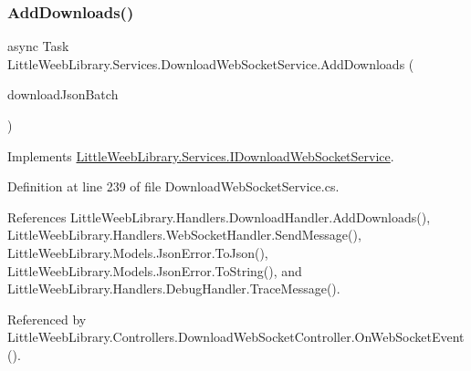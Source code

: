 \mbox{\label{class_little_weeb_library_1_1_services_1_1_download_web_socket_service_ad6afd5ee42650d16c67790c6d2ac80c1}} 
\subsubsection{\texorpdfstring{Add\+Downloads()}{AddDownloads()}}
{\footnotesize\ttfamily async Task Little\+Weeb\+Library.\+Services.\+Download\+Web\+Socket\+Service.\+Add\+Downloads (\begin{DoxyParamCaption}\item[{J\+Object}]{download\+Json\+Batch }\end{DoxyParamCaption})}



Implements \mbox{\hyperlink{interface_little_weeb_library_1_1_services_1_1_i_download_web_socket_service_ad25da3bc121e428c5bcead6bd2feb8aa}{Little\+Weeb\+Library.\+Services.\+I\+Download\+Web\+Socket\+Service}}.



Definition at line 239 of file Download\+Web\+Socket\+Service.\+cs.



References Little\+Weeb\+Library.\+Handlers.\+Download\+Handler.\+Add\+Downloads(), Little\+Weeb\+Library.\+Handlers.\+Web\+Socket\+Handler.\+Send\+Message(), Little\+Weeb\+Library.\+Models.\+Json\+Error.\+To\+Json(), Little\+Weeb\+Library.\+Models.\+Json\+Error.\+To\+String(), and Little\+Weeb\+Library.\+Handlers.\+Debug\+Handler.\+Trace\+Message().



Referenced by Little\+Weeb\+Library.\+Controllers.\+Download\+Web\+Socket\+Controller.\+On\+Web\+Socket\+Event().


